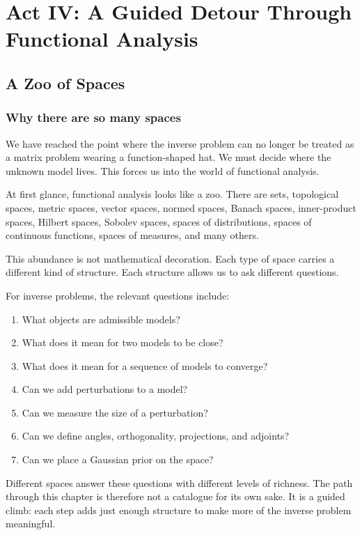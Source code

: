 \documentclass[11pt,a4paper]{book}
\begin{document}
\part{Act IV: A Guided Detour Through Functional Analysis}

\chapter{A Zoo of Spaces}

\section{Why there are so many spaces}

We have reached the point where the inverse problem can no longer be treated as
a matrix problem wearing a function-shaped hat. We must decide where the unknown
model lives. This forces us into the world of functional analysis.

At first glance, functional analysis looks like a zoo. There are sets,
topological spaces, metric spaces, vector spaces, normed spaces, Banach spaces,
inner-product spaces, Hilbert spaces, Sobolev spaces, spaces of distributions,
spaces of continuous functions, spaces of measures, and many others.

This abundance is not mathematical decoration. Each type of space carries a
different kind of structure. Each structure allows us to ask different
questions.

For inverse problems, the relevant questions include:
\begin{enumerate}[label=\arabic*.]
    \item What objects are admissible models?
    \item What does it mean for two models to be close?
    \item What does it mean for a sequence of models to converge?
    \item Can we add perturbations to a model?
    \item Can we measure the size of a perturbation?
    \item Can we define angles, orthogonality, projections, and adjoints?
    \item Can we place a Gaussian prior on the space?
\end{enumerate}

Different spaces answer these questions with different levels of richness. The
path through this chapter is therefore not a catalogue for its own sake. It is
a guided climb: each step adds just enough structure to make more of the inverse
problem meaningful.
\end{document}
